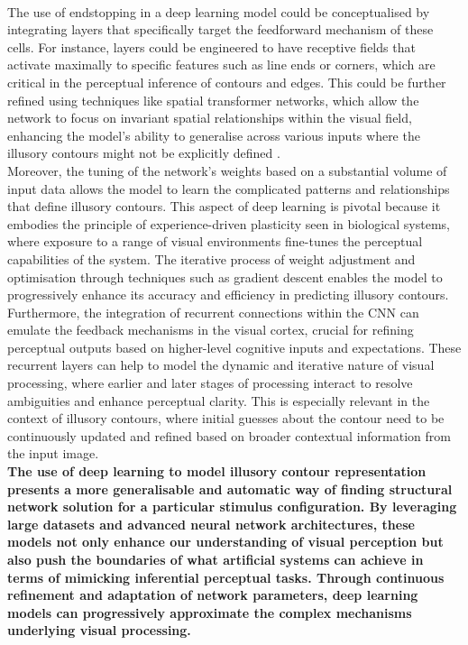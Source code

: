 \documentclass[12pt]{article}
\begin{document}
\\
The use of endstopping in a deep learning model could be conceptualised by integrating layers that specifically target the feedforward mechanism of these cells. For instance, layers could be engineered to have receptive fields that activate maximally to specific features such as line ends or corners, which are critical in the perceptual inference of contours and edges. This could be further refined using techniques like spatial transformer networks, which allow the network to focus on invariant spatial relationships within the visual field, enhancing the model's ability to generalise across various inputs where the illusory contours might not be explicitly defined \autocite{jaderbergSpatialTransformerNetworks2015}.
\\
Moreover, the tuning of the network's weights based on a substantial volume of input data allows the model to learn the complicated patterns and relationships that define illusory contours. This aspect of deep learning is pivotal because it embodies the principle of experience-driven plasticity seen in biological systems, where exposure to a range of visual environments fine-tunes the perceptual capabilities of the system. The iterative process of weight adjustment and optimisation through techniques such as gradient descent enables the model to progressively enhance its accuracy and efficiency in predicting illusory contours. 
\\
Furthermore, the integration of recurrent connections within the CNN can emulate the feedback mechanisms in the visual cortex, crucial for refining perceptual outputs based on higher-level cognitive inputs and expectations. These recurrent layers can help to model the dynamic and iterative nature of visual processing, where earlier and later stages of processing interact to resolve ambiguities and enhance perceptual clarity. This is especially relevant in the context of illusory contours, where initial guesses about the contour need to be continuously updated and refined based on broader contextual information from the input image.
\\
\textbf{The use of deep learning to model illusory contour representation presents a more generalisable and automatic way of finding structural network solution for a particular stimulus configuration. By leveraging large datasets and advanced neural network architectures, these models not only enhance our understanding of visual perception but also push the boundaries of what artificial systems can achieve in terms of mimicking inferential perceptual tasks. Through continuous refinement and adaptation of network parameters, deep learning models can progressively approximate the complex mechanisms underlying visual processing.}
\newpage
\end{document}
